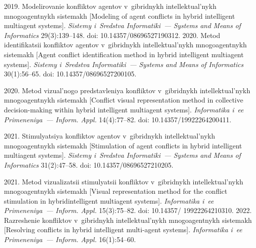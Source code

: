 





  \begin{multicols}{2}

\renewcommand{\bibname}{\protect\rmfamily References}

{\small\frenchspacing
 {%
 \begin{thebibliography}{99}
    2019. Modelirovanie konfliktov agentov 
v~gibridnykh intellektual'nykh mnogoagentnykh sistemakh [Modeling of agent conflicts in hybrid 
intelligent multiagent systems]. \textit{Sistemy i~Sredstva Informatiki~--- Systems and Means of 
Informatics} 29(3):139--148. doi: 10.14357/08696527190312.
    2020. Metod identifikatsii konfliktov agentov 
v~gibridnykh intellektual'nykh mnogoagentnykh sistemakh [Agent conflict identification method in 
hybrid intelligent multiagent systems]. \textit{Sistemy i~Sredstva Informatiki~--- Systems and 
Means of Informatics} 30(1):56--65. doi: 10.14357/08696527200105.

    2020. Metod vi\-zu\-al'\-no\-go predstavleniya 
konfliktov v~gibridnykh intellektual'nykh mnogoagentnykh sistemakh [Conflict visual 
representation method in collective decision-making within hybrid intelligent multiagent systems]. 
\textit{Informatika i~ee Primeneniya~--- Inform. Appl.} 14(4):77--82. doi: 
10.14357/19922264200411. 

    2021. Stimulyatsiya konfliktov agentov 
v~gibridnykh intellektual'nykh mnogoagentnykh sistemakh [Stimulation of agent conflicts in hybrid 
intelligent multiagent systems]. \textit{Sistemy i~Sredstva Informatiki~--- Systems and Means of 
Informatics} 31(2):47--58. doi: 10.14357/08696527210205.

    2021. Metod vi\-zu\-a\-li\-za\-tsii stimulyatsii konfliktov 
v~gibridnykh intellektual'nykh mnogoagentnykh sistemakh [Visual representation method for the 
conflict stimulation in hybrid\linebreak intelligent multiagent systems]. \textit{Informatika i~ee 
Primeneniya~--- Inform. Appl.} 15(3):75--82. doi: 10.14357/ 19922264210310. 
    2022. Razreshenie konfliktov v~gibridnykh 
intellektual'nykh mnogoagentnykh sistemakh [Resolving conflicts in hybrid intelligent multi-agent 
systems]. \textit{Informatika i~ee Primeneniya~--- Inform. Appl.} 16(1):54--60.


\end{thebibliography}}}
\end{multicols}
